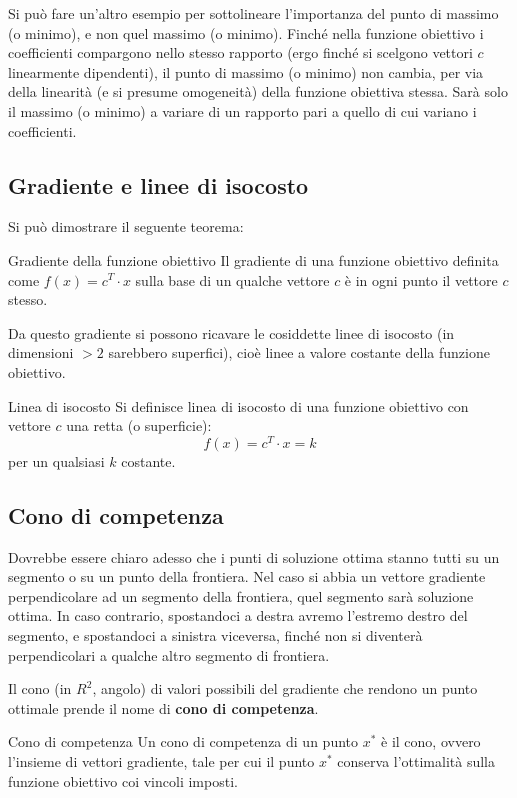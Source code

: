 \documentclass[a4paper,11pt]{article}
\begin{document}
Si può fare un'altro esempio per sottolineare l'importanza del punto di massimo (o minimo), e non quel massimo (o minimo).
Finché nella funzione obiettivo i coefficienti compargono nello stesso rapporto (ergo finché si scelgono vettori $c$ linearmente dipendenti), il punto di massimo (o minimo) non cambia, per via della linearità (e si presume omogeneità) della funzione obiettiva stessa.
Sarà solo il massimo (o minimo) a variare di un rapporto pari a quello di cui variano i coefficienti.

\subsection{Gradiente e linee di isocosto}
Si può dimostrare il seguente teorema:
\begin{theorem}{Gradiente della funzione obiettivo}
	Il gradiente di una funzione obiettivo definita come $ f(x) = c^T \cdot x $ sulla base di un qualche vettore $c$ è in ogni punto il vettore $c$ stesso.
\end{theorem}
Da questo gradiente si possono ricavare le cosiddette linee di isocosto (in dimensioni $>2$ sarebbero superfici), cioè linee a valore costante della funzione obiettivo.
\begin{definition}{Linea di isocosto}
	Si definisce linea di isocosto di una funzione obiettivo con vettore $c$ una retta (o superficie):	
	$$ f(x) = c^T \cdot x = k $$
	per un qualsiasi $k$ costante.
\end{definition}

\subsection{Cono di competenza}
Dovrebbe essere chiaro adesso che i punti di soluzione ottima stanno tutti su un segmento o su un punto della frontiera.
Nel caso si abbia un vettore gradiente perpendicolare ad un segmento della frontiera, quel segmento sarà soluzione ottima. In caso contrario, spostandoci a destra avremo l'estremo destro del segmento, e spostandoci a sinistra viceversa, finché non si diventerà perpendicolari a qualche altro segmento di frontiera.

Il cono (in $R^2$, angolo) di valori possibili del gradiente che rendono un punto ottimale prende il nome di \textbf{cono di competenza}.
\begin{definition}{Cono di competenza}
	Un cono di competenza di un punto $x^*$ è il cono, ovvero l'insieme di vettori gradiente, tale per cui il punto $x^*$ conserva l'ottimalità sulla funzione obiettivo coi vincoli imposti.
\end{definition}
\end{document}
